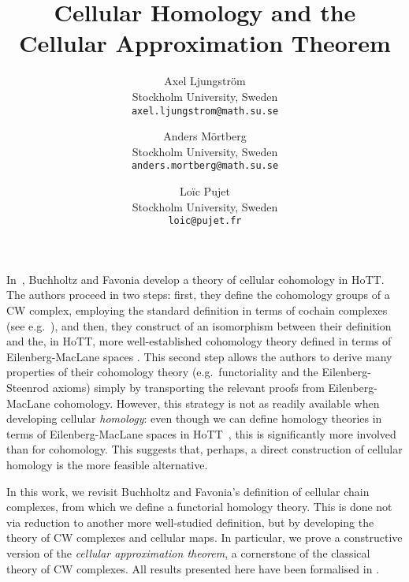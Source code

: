 \documentclass[a4page]{article}
\title{Cellular Homology and the Cellular Approximation Theorem}
\author{
  Axel Ljungström\\
  \footnotesize{Stockholm University, Sweden}\\
  \footnotesize{\texttt{axel.ljungstrom@math.su.se}}
  \and
  Anders Mörtberg\\
  \footnotesize{Stockholm University, Sweden}\\
  \footnotesize{\texttt{anders.mortberg@math.su.se}}
  \and
  Loïc Pujet\\
  \footnotesize{Stockholm University, Sweden}\\
  \footnotesize{\texttt{loic@pujet.fr}}
}
\date{}
\begin{document}
\maketitle
\vspace{-.5cm}
%
In~\cite{BuchholtzFavonia18}, Buchholtz and Favonia develop a theory
of cellular cohomology in HoTT. The authors proceed in two steps:
%
first, they define the cohomology groups of a CW complex, employing the
standard definition in terms of cochain complexes (see e.g.\ \cite{May1999}),
and then, they construct of an isomorphism between their definition and
the, in HoTT, more well-established cohomology theory defined in terms of Eilenberg-MacLane
spaces \cite{ShulmanBlog13,LicataFinster14,CavalloMsc15}.
%
This second step allows the authors to derive many properties of their
cohomology theory (e.g.\ functoriality and the Eilenberg-Steenrod axioms)
simply by transporting the relevant proofs from Eilenberg-MacLane cohomology.
%
However, this strategy is not as readily available when developing cellular \emph{homology}:
%
even though we can define homology theories in terms of Eilenberg-MacLane spaces in HoTT~\cite{graham18,christensen2020hurewicz,FlorisPhd,spectralsequences}, this is significantly more involved than for cohomology. This suggests that, perhaps, a direct construction of cellular homology is the more feasible alternative.

In this work, we revisit Buchholtz and Favonia's
definition of cellular chain complexes, from which we define a functorial homology theory. This is done not via reduction to another more
well-studied definition, but by developing the theory of CW complexes and
cellular maps.
%
In particular, we prove a constructive version of the \emph{cellular
  approximation theorem}, a cornerstone of the classical theory of CW complexes. All results presented here have been formalised in \CubicalAgda \cite{cubicalagda2}.

\smallskip
\end{document}
